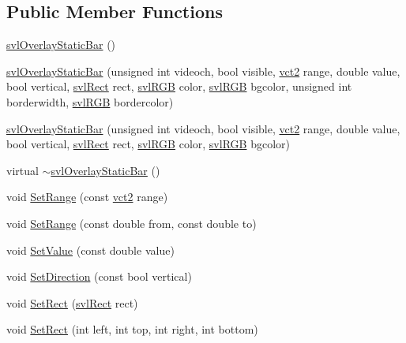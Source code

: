 \subsection*{Public Member Functions}
\begin{DoxyCompactItemize}
\item 
\hyperlink{classsvl_overlay_static_bar_a7e00d33b90509cb9e1f31e1b9750248e}{svl\+Overlay\+Static\+Bar} ()
\item 
\hyperlink{classsvl_overlay_static_bar_ac0e1d9e708f1d70467c823edf19b41a3}{svl\+Overlay\+Static\+Bar} (unsigned int videoch, bool visible, \hyperlink{vct_fixed_size_vector_types_8h_a88481ac3c794867ba5e4e92624f0d958}{vct2} range, double value, bool vertical, \hyperlink{structsvl_rect}{svl\+Rect} rect, \hyperlink{structsvl_r_g_b}{svl\+R\+G\+B} color, \hyperlink{structsvl_r_g_b}{svl\+R\+G\+B} bgcolor, unsigned int borderwidth, \hyperlink{structsvl_r_g_b}{svl\+R\+G\+B} bordercolor)
\item 
\hyperlink{classsvl_overlay_static_bar_a55929777b7011f41bf6c11db97d0d2bf}{svl\+Overlay\+Static\+Bar} (unsigned int videoch, bool visible, \hyperlink{vct_fixed_size_vector_types_8h_a88481ac3c794867ba5e4e92624f0d958}{vct2} range, double value, bool vertical, \hyperlink{structsvl_rect}{svl\+Rect} rect, \hyperlink{structsvl_r_g_b}{svl\+R\+G\+B} color, \hyperlink{structsvl_r_g_b}{svl\+R\+G\+B} bgcolor)
\item 
virtual \hyperlink{classsvl_overlay_static_bar_a87aeb5d0550c756213e8041bf43690e9}{$\sim$svl\+Overlay\+Static\+Bar} ()
\item 
void \hyperlink{classsvl_overlay_static_bar_a34bf99f8a0ed100fa44ea31ec2e0101f}{Set\+Range} (const \hyperlink{vct_fixed_size_vector_types_8h_a88481ac3c794867ba5e4e92624f0d958}{vct2} range)
\item 
void \hyperlink{classsvl_overlay_static_bar_a8bcc9dd8787c5157d6e64b72f61dbf52}{Set\+Range} (const double from, const double to)
\item 
void \hyperlink{classsvl_overlay_static_bar_a7581da9a4edb37aceedc589400003f4d}{Set\+Value} (const double value)
\item 
void \hyperlink{classsvl_overlay_static_bar_ada501fb04b1874d1a2275bfbd669d528}{Set\+Direction} (const bool vertical)
\item 
void \hyperlink{classsvl_overlay_static_bar_a1a2c96ca85b7ff468c8ed01d4fabeb01}{Set\+Rect} (\hyperlink{structsvl_rect}{svl\+Rect} rect)
\item 
void \hyperlink{classsvl_overlay_static_bar_acaf767fba295ad83efaafcb7a888c92c}{Set\+Rect} (int left, int top, int right, int bottom)

\end{DoxyCompactItemize}
